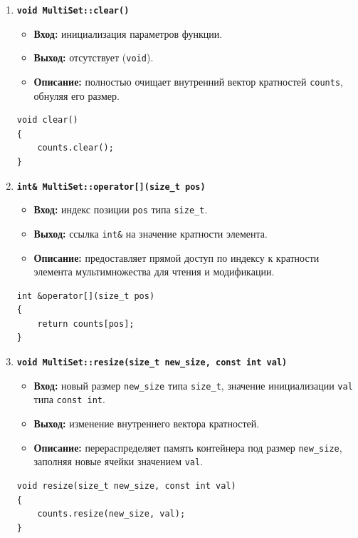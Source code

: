 \documentclass[14pt, a4paper]{extarticle}
\begin{document}
\begin{enumerate}[label=\arabic*.]
		\item \textbf{\texttt{void MultiSet::clear()}}
		\begin{itemize}[leftmargin=*, noitemsep]
			\item \textbf{Вход:} инициализация параметров функции.
			\item \textbf{Выход:} отсутствует (\texttt{void}).
			\item \textbf{Описание:} полностью очищает внутренний вектор кратностей \texttt{counts}, обнуляя его размер.
		\end{itemize}
		\begin{lstlisting}[caption={Метод MultiSet::clear()}, label={lst:multiset_clear}]
void clear()
{
    counts.clear();
}
		\end{lstlisting}
		
		\item \textbf{\texttt{int\& MultiSet::operator[](size\_t pos)}}
		\begin{itemize}[leftmargin=*, noitemsep]
			\item \textbf{Вход:} индекс позиции \texttt{pos} типа \texttt{size\_t}.
			\item \textbf{Выход:} ссылка \texttt{int\&} на значение кратности элемента.
			\item \textbf{Описание:} предоставляет прямой доступ по индексу к кратности элемента мультимножества для чтения и модификации.
		\end{itemize}
		\begin{lstlisting}[caption={Оператор MultiSet::operator{[]}}, label={lst:multiset_op_index}]
int &operator[](size_t pos)
{
    return counts[pos];
}
		\end{lstlisting}
		
		\item \textbf{\texttt{void MultiSet::resize(size\_t new\_size, const int val)}}
		\begin{itemize}[leftmargin=*, noitemsep]
			\item \textbf{Вход:} новый размер \texttt{new\_size} типа \texttt{size\_t}, значение инициализации \texttt{val} типа \texttt{const int}.
			\item \textbf{Выход:} изменение внутреннего вектора кратностей.
			\item \textbf{Описание:} перераспределяет память контейнера под размер \texttt{new\_size}, заполняя новые ячейки значением \texttt{val}.
		\end{itemize}
		\begin{lstlisting}[caption={Метод MultiSet::resize()}, label={lst:multiset_resize}]
void resize(size_t new_size, const int val)
{
    counts.resize(new_size, val);
}
		\end{lstlisting}
		

\end{enumerate}
\end{document}
